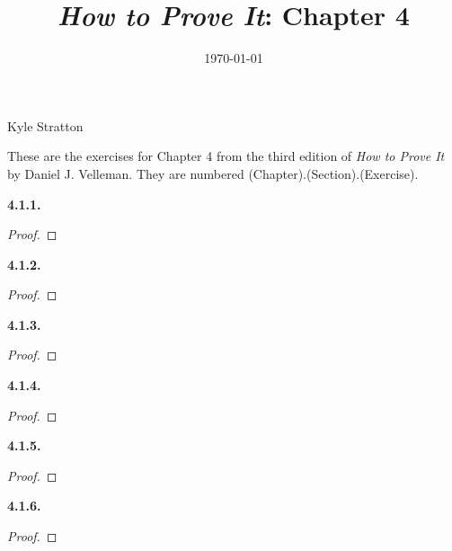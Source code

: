 \documentclass[12pt]{amsart}
\title{\emph{How to Prove It}: Chapter 4} %
\date{\today}
\newenvironment{statement}[1]{\smallskip\noindent\color[rgb]{.6627, .3529, .6314} {\bf #1.}}{}
\theoremstyle{definition}
\theoremstyle{remark}
\begin{document}
\maketitle

\vspace*{-0.25in}
\centerline{Kyle Stratton}

\begin{framed}
These are the exercises for Chapter 4 from the third edition of \emph{How to Prove It} by Daniel J. Velleman.
They are numbered (Chapter).(Section).(Exercise).
\end{framed}

\begin{statement}{4.1.1}
\end{statement}

\begin{proof}
\end{proof}


\begin{statement}{4.1.2}
\end{statement}

\begin{proof}
\end{proof}


\begin{statement}{4.1.3}
\end{statement}

\begin{proof}
\end{proof}


\begin{statement}{4.1.4}
\end{statement}

\begin{proof}
\end{proof}


\begin{statement}{4.1.5}
\end{statement}

\begin{proof}
\end{proof}


\begin{statement}{4.1.6}
\end{statement}

\begin{proof}
\end{proof}
\end{document}
